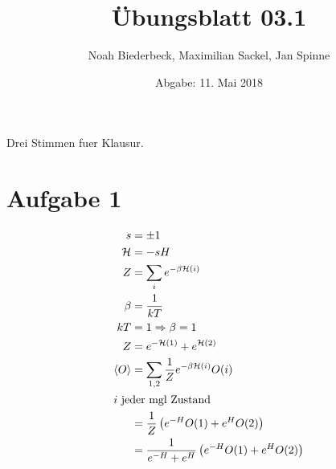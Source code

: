 \documentclass{scrartcl}
\title{Übungsblatt 03.1}
\author{%
  Noah Biederbeck, Maximilian Sackel, Jan Spinne
}
\date{Abgabe: 11. Mai 2018}
\begin{document}
\maketitle

Drei Stimmen fuer Klausur.

\section*{Aufgabe 1}
\begin{align}
  s &= \pm 1 \\
  \mathcal{H} &= -sH \\
  Z &= \sum_i e^{-\beta \mathcal{H}(i)} \\
  \beta &= \frac{1}{kT} \\
  kT &= 1 \Rightarrow \beta = 1 \\
  Z &= e^{-\mathcal{H}(1)} + e^{ \mathcal{H}(2) } \\
  \left<O\right> &= \sum_{1, 2} \frac{1}{Z} e^{-\beta \mathcal{H} (i)} O(i) \\
  \intertext{$i$ jeder mgl Zustand}
                 &= \frac{1}{Z} \left( e^{-H} O(1) + e^H  O(2) \right)\\
                 &= \frac{1}{e^{-H} + e^H} \left( e^{-H} O(1) + e^H  O(2) \right) \\
\end{align}
\end{document}
